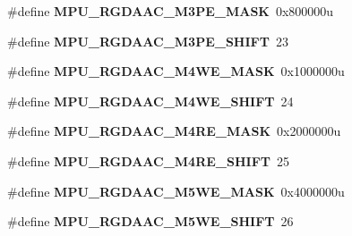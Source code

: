 \begin{DoxyCompactItemize}
\item 
\hypertarget{group___m_p_u___register___masks_gaf361bfcfc19483a42793f5e71e671d24}{}\#define {\bfseries M\+P\+U\+\_\+\+R\+G\+D\+A\+A\+C\+\_\+\+M3\+P\+E\+\_\+\+M\+A\+S\+K}~0x800000u\label{group___m_p_u___register___masks_gaf361bfcfc19483a42793f5e71e671d24}

\item 
\hypertarget{group___m_p_u___register___masks_ga8a60d03cdf81d71a14695b19a9dcddbc}{}\#define {\bfseries M\+P\+U\+\_\+\+R\+G\+D\+A\+A\+C\+\_\+\+M3\+P\+E\+\_\+\+S\+H\+I\+F\+T}~23\label{group___m_p_u___register___masks_ga8a60d03cdf81d71a14695b19a9dcddbc}

\item 
\hypertarget{group___m_p_u___register___masks_ga83e0fd88964bf881fff84ec5148be122}{}\#define {\bfseries M\+P\+U\+\_\+\+R\+G\+D\+A\+A\+C\+\_\+\+M4\+W\+E\+\_\+\+M\+A\+S\+K}~0x1000000u\label{group___m_p_u___register___masks_ga83e0fd88964bf881fff84ec5148be122}

\item 
\hypertarget{group___m_p_u___register___masks_gab956bade9f6a200c49007ae0385b5838}{}\#define {\bfseries M\+P\+U\+\_\+\+R\+G\+D\+A\+A\+C\+\_\+\+M4\+W\+E\+\_\+\+S\+H\+I\+F\+T}~24\label{group___m_p_u___register___masks_gab956bade9f6a200c49007ae0385b5838}

\item 
\hypertarget{group___m_p_u___register___masks_ga19bff0a0a5537826851816728dbe1845}{}\#define {\bfseries M\+P\+U\+\_\+\+R\+G\+D\+A\+A\+C\+\_\+\+M4\+R\+E\+\_\+\+M\+A\+S\+K}~0x2000000u\label{group___m_p_u___register___masks_ga19bff0a0a5537826851816728dbe1845}

\item 
\hypertarget{group___m_p_u___register___masks_ga2396d0d3aa02d1ce7d63b375306171db}{}\#define {\bfseries M\+P\+U\+\_\+\+R\+G\+D\+A\+A\+C\+\_\+\+M4\+R\+E\+\_\+\+S\+H\+I\+F\+T}~25\label{group___m_p_u___register___masks_ga2396d0d3aa02d1ce7d63b375306171db}

\item 
\hypertarget{group___m_p_u___register___masks_ga9a15b77ff19841d163202e5f08e59941}{}\#define {\bfseries M\+P\+U\+\_\+\+R\+G\+D\+A\+A\+C\+\_\+\+M5\+W\+E\+\_\+\+M\+A\+S\+K}~0x4000000u\label{group___m_p_u___register___masks_ga9a15b77ff19841d163202e5f08e59941}

\item 
\hypertarget{group___m_p_u___register___masks_ga32b48238ec363343bb84eb701503ac64}{}\#define {\bfseries M\+P\+U\+\_\+\+R\+G\+D\+A\+A\+C\+\_\+\+M5\+W\+E\+\_\+\+S\+H\+I\+F\+T}~26\label{group___m_p_u___register___masks_ga32b48238ec363343bb84eb701503ac64}


\end{DoxyCompactItemize}
